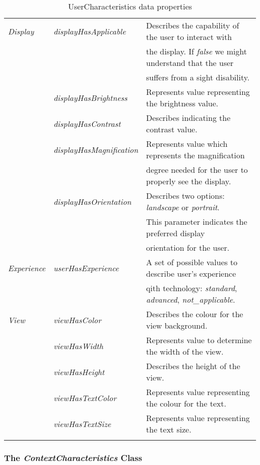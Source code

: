 \begin{center}
\begin{longtable}{l l l}
  \textit{Display}	& \textit{displayHasApplicable}	& Describes the capability of the user to interact with			\\
			& 				& the display. If \textit{false} we might understand that the user 	\\
			& 				& suffers from a sight disability.		 			\\
			& \textit{displayHasBrightness}	& Represents value representing the brightness value.			\\
			& \textit{displayHasContrast}	& Describes indicating the contrast value.				\\
			& \textit{displayHasMagnification}& Represents value which represents the magnification			\\ 
			&				& degree needed for the user to properly see the display.		\\
			& \textit{displayHasOrientation}& Describes two options: \textit{landscape} or \textit{portrait}.  	\\
			& 				& This parameter indicates the preferred display 	 		\\
			&				& orientation for the user.						\\
  
  \textit{Experience}	& \textit{userHasExperience}	& A set of possible values to describe user's experience 		\\
			& 				& qith technology: \textit{standard}, \textit{advanced}, \textit{not\_applicable}.\\
  
  \textit{View}		& \textit{viewHasColor}		& Describes the colour for the view background.				\\
			& \textit{viewHasWidth}		& Represents value to determine the width of the view.			\\
			& \textit{viewHasHeight}	& Describes the height of the view.					\\
			& \textit{viewHasTextColor}	& Represents value representing the colour for the text.		\\
			& \textit{viewHasTextSize}	& Represents value representing the text size.				\\
  \hline 
\caption{UserCharacteristics data properties}
\end{longtable}
\end{center}


\subsubsection{The \textit{ContextCharacteristics} Class}
\label{sec:context_characteristics_class}

